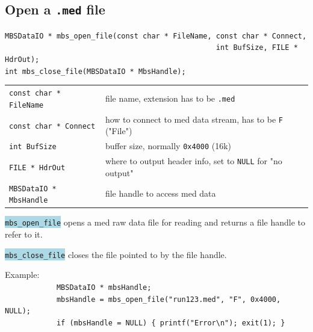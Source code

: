 \documentclass[10pt,a4paper]{article}
\newcommand{\blue}[1]{\colorbox{lightblue}{\texttt{#1}}}
\newenvironment{yellowboxed}
	{\begin{Sbox}\begin{minipage}[t]}
	{\end{minipage}\end{Sbox}\colorbox{yellow}{\TheSbox}}
\newenvironment{blueboxed}
	{\begin{Sbox}\begin{minipage}[t]}
	{\end{minipage}\end{Sbox}\colorbox{lightblue}{\TheSbox}}
\begin{document}
\subsection{Open a \texttt{.med} file}\vspace{3mm}
\begin{blueboxed}{\linewidth}
	\verb+MBSDataIO * mbs_open_file(const char * FileName, const char * Connect,+\\
	\verb+                                                 int BufSize, FILE * HdrOut);+\\
	\verb+int mbs_close_file(MBSDataIO * MbsHandle);+
\end{blueboxed}
\begin{center}
\begin{tabular}{ll}
\verb+const char * FileName+	& file name, extension has to be \verb+.med+\\
\verb+const char * Connect+	& how to connect to med data stream, has to be \verb+F+ ("File")\\
\verb+int BufSize+		& buffer size, normally \verb+0x4000+ (16k)\\
\verb+FILE * HdrOut+		& where to output header info, set to \verb+NULL+ for "no output"\\
\verb+MBSDataIO * MbsHandle+	& file handle to access med data\\
\end{tabular}
\end{center}
\blue{mbs\_open\_file} opens a med raw data file for reading and returns a file handle to refer to it.

\blue{mbs\_close\_file} closes the file pointed to by the file handle.
\vspace{5mm}

\begin{yellowboxed}{\linewidth}
Example:\\
\verb+            MBSDataIO * mbsHandle;+\\
\verb+            mbsHandle = mbs_open_file("run123.med", "F", 0x4000, NULL);+\\
\verb+            if (mbsHandle = NULL) { printf("Error\n"); exit(1); }+\\
\end{yellowboxed}\vspace{5mm}
\newpage
\end{document}
